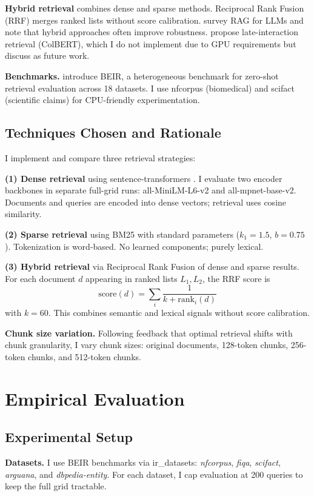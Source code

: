 \documentclass[twoside, 11pt]{article}
\begin{document}
\textbf{Hybrid retrieval} combines dense and sparse methods. Reciprocal Rank Fusion (RRF) merges ranked lists without score calibration. \citet{gao2022rag} survey RAG for LLMs and note that hybrid approaches often improve robustness. \citet{khattab2020colbert} propose late-interaction retrieval (ColBERT), which I do not implement due to GPU requirements but discuss as future work.

\textbf{Benchmarks.} \citet{thakur2021beir} introduce BEIR, a heterogeneous benchmark for zero-shot retrieval evaluation across 18 datasets. I use nfcorpus (biomedical) and scifact (scientific claims) for CPU-friendly experimentation.

\subsection{Techniques Chosen and Rationale}
I implement and compare three retrieval strategies:

\textbf{(1) Dense retrieval} using sentence-transformers \citep{reimers2019sentencebert}. I evaluate two encoder backbones in separate full-grid runs: all-MiniLM-L6-v2 and all-mpnet-base-v2. Documents and queries are encoded into dense vectors; retrieval uses cosine similarity.

\textbf{(2) Sparse retrieval} using BM25 with standard parameters ($k_1 = 1.5$, $b = 0.75$). Tokenization is word-based. No learned components; purely lexical.

\textbf{(3) Hybrid retrieval} via Reciprocal Rank Fusion of dense and sparse results. For each document $d$ appearing in ranked lists $L_1, L_2$, the RRF score is
$$
\text{score}(d) = \sum_{i} \frac{1}{k + \text{rank}_i(d)}
$$
with $k = 60$. This combines semantic and lexical signals without score calibration.

\textbf{Chunk size variation.} Following feedback that optimal retrieval shifts with chunk granularity, I vary chunk sizes: original documents, 128-token chunks, 256-token chunks, and 512-token chunks.

\section{Empirical Evaluation}
\subsection{Experimental Setup}
\textbf{Datasets.} I use BEIR benchmarks via ir\_datasets: \textit{nfcorpus}, \textit{fiqa}, \textit{scifact}, \textit{arguana}, and \textit{dbpedia-entity}. For each dataset, I cap evaluation at 200 queries to keep the full grid tractable.
\end{document}
